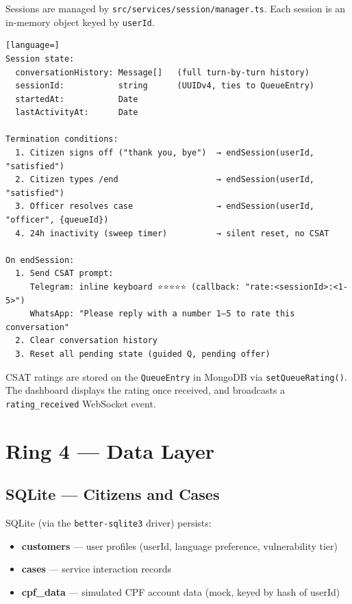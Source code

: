 \documentclass[12pt,a4paper]{article}
\begin{document}
Sessions are managed by \texttt{src/services/session/manager.ts}. Each session is
an in-memory object keyed by \texttt{userId}.

\begin{lstlisting}[language=]
Session state:
  conversationHistory: Message[]   (full turn-by-turn history)
  sessionId:           string      (UUIDv4, ties to QueueEntry)
  startedAt:           Date
  lastActivityAt:      Date

Termination conditions:
  1. Citizen signs off ("thank you, bye")  → endSession(userId, "satisfied")
  2. Citizen types /end                    → endSession(userId, "satisfied")
  3. Officer resolves case                 → endSession(userId, "officer", {queueId})
  4. 24h inactivity (sweep timer)          → silent reset, no CSAT

On endSession:
  1. Send CSAT prompt:
     Telegram: inline keyboard ⭐⭐⭐⭐⭐ (callback: "rate:<sessionId>:<1-5>")
     WhatsApp: "Please reply with a number 1–5 to rate this conversation"
  2. Clear conversation history
  3. Reset all pending state (guided Q, pending offer)
\end{lstlisting}

CSAT ratings are stored on the \texttt{QueueEntry} in MongoDB via \texttt{setQueueRating()}.
The dashboard displays the rating once received, and broadcasts a \texttt{rating\_received}
WebSocket event.

\section{Ring 4 — Data Layer}
\label{sec:data}

\subsection{SQLite — Citizens and Cases}

SQLite (via the \texttt{better-sqlite3} driver) persists:
\begin{itemize}[noitemsep]
  \item \textbf{customers} — user profiles (userId, language preference, vulnerability tier)
  \item \textbf{cases} — service interaction records
  \item \textbf{cpf\_data} — simulated CPF account data (mock, keyed by hash of userId)
\end{itemize}
\end{document}
